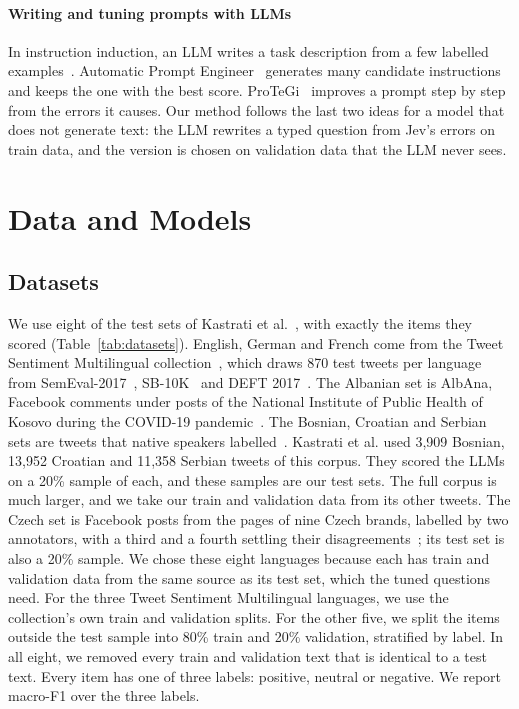 \documentclass[sigconf]{acmart}
\begin{document}
\paragraph{Writing and tuning prompts with LLMs}
In instruction induction, an LLM writes a task description from a few labelled examples~\cite{honovich2023instruction}. Automatic Prompt Engineer~\cite{zhou2023ape} generates many candidate instructions and keeps the one with the best score. ProTeGi~\cite{pryzant2023protegi} improves a prompt step by step from the errors it causes. Our method follows the last two ideas for a model that does not generate text: the LLM rewrites a typed question from Jev's errors on train data, and the version is chosen on validation data that the LLM never sees.

\section{Data and Models}

\subsection{Datasets}
\label{sec:datasets}
We use eight of the test sets of Kastrati et al.~\cite{kastrati2026language}, with exactly the items they scored (Table~\ref{tab:datasets}). English, German and French come from the Tweet Sentiment Multilingual collection~\cite{barbieri2022xlmt}, which draws 870 test tweets per language from SemEval-2017~\cite{rosenthal2017semeval}, SB-10K~\cite{cieliebak2017sb10k} and DEFT 2017~\cite{benamara2017deft}. The Albanian set is AlbAna, Facebook comments under posts of the National Institute of Public Health of Kosovo during the COVID-19 pandemic~\cite{kastrati2021albana}. The Bosnian, Croatian and Serbian sets are tweets that native speakers labelled~\cite{mozetic2016multilingual,mozetic2018evaluate}. Kastrati et al. used 3,909 Bosnian, 13,952 Croatian and 11,358 Serbian tweets of this corpus. They scored the LLMs on a 20\% sample of each, and these samples are our test sets. The full corpus is much larger, and we take our train and validation data from its other tweets. The Czech set is Facebook posts from the pages of nine Czech brands, labelled by two annotators, with a third and a fourth settling their disagreements~\cite{habernal2013czech}; its test set is also a 20\% sample. We chose these eight languages because each has train and validation data from the same source as its test set, which the tuned questions need.
For the three Tweet Sentiment Multilingual languages, we use the collection's own train and validation splits. For the other five, we split the items outside the test sample into 80\% train and 20\% validation, stratified by label. In all eight, we removed every train and validation text that is identical to a test text. Every item has one of three labels: positive, neutral or negative. We report macro-F1 over the three labels.
\end{document}
